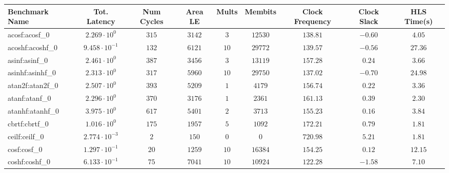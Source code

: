 \begin{tabular}{|l|c|c|c|c|c|c|c|c|}
\hline
Benchmark Name               & Tot. Latency            & Num Cycles & Area LE    & Mults   & Membits    & Clock Frequency & Clock Slack & HLS Time(s) \\
\hline
acosf:acosf\_0               & $ 2.269 \cdot 10^{0}  $ & $ 315    $ & $ 3142   $ & $ 3   $ & $ 12530  $ & $ 138.81      $ & $ -0.60   $ & $ 4.05    $ \\
acoshf:acoshf\_0             & $ 9.458 \cdot 10^{-1} $ & $ 132    $ & $ 6121   $ & $ 10  $ & $ 29772  $ & $ 139.57      $ & $ -0.56   $ & $ 27.36   $ \\
asinf:asinf\_0               & $ 2.461 \cdot 10^{0}  $ & $ 387    $ & $ 3456   $ & $ 3   $ & $ 13119  $ & $ 157.28      $ & $ 0.24    $ & $ 3.66    $ \\
asinhf:asinhf\_0             & $ 2.313 \cdot 10^{0}  $ & $ 317    $ & $ 5960   $ & $ 10  $ & $ 29750  $ & $ 137.02      $ & $ -0.70   $ & $ 24.98   $ \\
atan2f:atan2f\_0             & $ 2.507 \cdot 10^{0}  $ & $ 393    $ & $ 5209   $ & $ 1   $ & $ 4179   $ & $ 156.74      $ & $ 0.22    $ & $ 3.36    $ \\
atanf:atanf\_0               & $ 2.296 \cdot 10^{0}  $ & $ 370    $ & $ 3176   $ & $ 1   $ & $ 2361   $ & $ 161.13      $ & $ 0.39    $ & $ 2.30    $ \\
atanhf:atanhf\_0             & $ 3.975 \cdot 10^{0}  $ & $ 617    $ & $ 5401   $ & $ 2   $ & $ 3713   $ & $ 155.23      $ & $ 0.16    $ & $ 3.84    $ \\
cbrtf:cbrtf\_0               & $ 1.016 \cdot 10^{0}  $ & $ 175    $ & $ 1957   $ & $ 5   $ & $ 1092   $ & $ 172.21      $ & $ 0.79    $ & $ 1.81    $ \\
ceilf:ceilf\_0               & $ 2.774 \cdot 10^{-3} $ & $ 2      $ & $ 150    $ & $ 0   $ & $ 0      $ & $ 720.98      $ & $ 5.21    $ & $ 1.81    $ \\
cosf:cosf\_0                 & $ 1.297 \cdot 10^{-1} $ & $ 20     $ & $ 1259   $ & $ 10  $ & $ 16384  $ & $ 154.25      $ & $ 0.12    $ & $ 12.15   $ \\
coshf:coshf\_0               & $ 6.133 \cdot 10^{-1} $ & $ 75     $ & $ 7041   $ & $ 10  $ & $ 10924  $ & $ 122.28      $ & $ -1.58   $ & $ 7.10    $ \\

\end{tabular}

